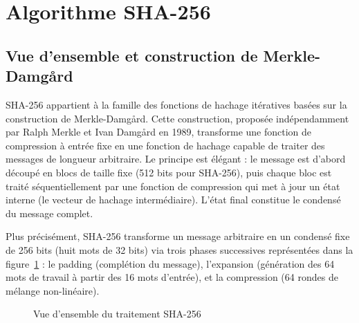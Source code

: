 \section{Algorithme SHA-256}
\label{sec:algo}

\subsection{Vue d'ensemble et construction de Merkle-Damgård}

SHA-256 appartient à la famille des fonctions de hachage itératives basées sur la construction de Merkle-Damgård. Cette construction, proposée indépendamment par Ralph Merkle et Ivan Damgård en 1989, transforme une fonction de compression à entrée fixe en une fonction de hachage capable de traiter des messages de longueur arbitraire. Le principe est élégant : le message est d'abord découpé en blocs de taille fixe (512 bits pour SHA-256), puis chaque bloc est traité séquentiellement par une fonction de compression qui met à jour un état interne (le vecteur de hachage intermédiaire). L'état final constitue le condensé du message complet.

Plus précisément, SHA-256 transforme un message arbitraire en un condensé fixe de 256 bits (huit mots de 32 bits) via trois phases successives représentées dans la figure~\ref{fig:algo_overview} : le padding (complétion du message), l'expansion (génération des 64 mots de travail à partir des 16 mots d'entrée), et la compression (64 rondes de mélange non-linéaire).

\begin{figure}[H]
\centering
{}
\caption{Vue d'ensemble du traitement SHA-256}
\label{fig:algo_overview}
\end{figure}

